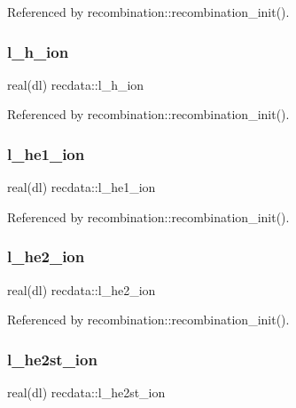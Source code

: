 Referenced by recombination\+::recombination\+\_\+init().

\mbox{\label{namespacerecdata_ae841ee816424d8ed36613769eac72b75}} 
\subsubsection{\texorpdfstring{l\+\_\+h\+\_\+ion}{l\_h\_ion}}
{\footnotesize\ttfamily real(dl) recdata\+::l\+\_\+h\+\_\+ion}



Referenced by recombination\+::recombination\+\_\+init().

\mbox{\label{namespacerecdata_a88ef0c92d1cad9570136fa55d1899af0}} 
\subsubsection{\texorpdfstring{l\+\_\+he1\+\_\+ion}{l\_he1\_ion}}
{\footnotesize\ttfamily real(dl) recdata\+::l\+\_\+he1\+\_\+ion}



Referenced by recombination\+::recombination\+\_\+init().

\mbox{\label{namespacerecdata_a09a8999d2bef3fe3af6c0216cb534b5d}} 
\subsubsection{\texorpdfstring{l\+\_\+he2\+\_\+ion}{l\_he2\_ion}}
{\footnotesize\ttfamily real(dl) recdata\+::l\+\_\+he2\+\_\+ion}



Referenced by recombination\+::recombination\+\_\+init().

\mbox{\label{namespacerecdata_a19e8a17a31cb50954e10fa514602a043}} 
\subsubsection{\texorpdfstring{l\+\_\+he2st\+\_\+ion}{l\_he2st\_ion}}
{\footnotesize\ttfamily real(dl) recdata\+::l\+\_\+he2st\+\_\+ion}



